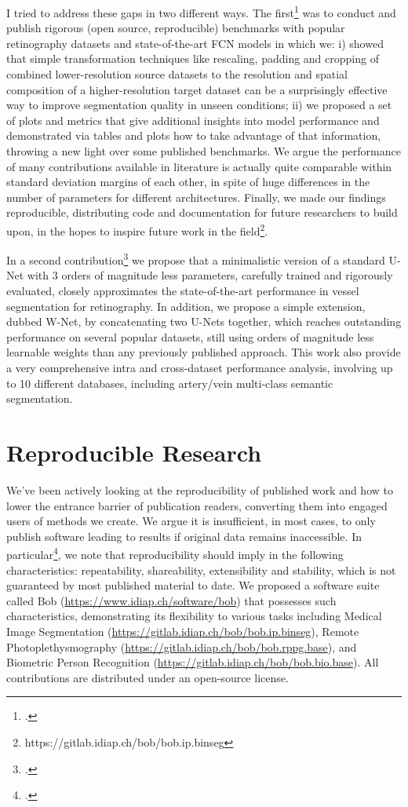 \documentclass[a4paper,10pt,onecolumn]{article}
\begin{document}
I tried to address these gaps in two different ways.  The
first\footcite{arxiv-2019} was to conduct and publish rigorous (open source,
reproducible) benchmarks with popular retinography datasets and
state-of-the-art FCN models in which we: i) showed that simple transformation
techniques like rescaling, padding and cropping of combined lower-resolution
source datasets to the resolution and spatial composition of a
higher-resolution target dataset can be a surprisingly effective way to improve
segmentation quality in unseen conditions; ii) we proposed a set of plots and
metrics that give additional insights into model performance and demonstrated
via tables and plots how to take advantage of that information, throwing a new
light over some published benchmarks.  We argue the performance of many
contributions available in literature is actually quite comparable within
standard deviation margins of each other, in spite of huge differences in the
number of parameters for different architectures.  Finally, we made our
findings reproducible, distributing code and documentation for future
researchers to build upon, in the hopes to inspire future work in the
field\footnote{https://gitlab.idiap.ch/bob/bob.ip.binseg}.

In a second contribution\footcite{arxiv-2020} we propose that a minimalistic
version of a standard U-Net with 3 orders of magnitude less parameters,
carefully trained and rigorously evaluated, closely approximates the
state-of-the-art performance in vessel segmentation for retinography.  In
addition, we propose a simple extension, dubbed W-Net, by concatenating two
U-Nets together, which reaches outstanding performance on several popular
datasets, still using orders of magnitude less learnable weights than any
previously published approach.  This work also provide a very comprehensive
intra and cross-dataset performance analysis, involving up to 10 different
databases, including artery/vein multi-class semantic segmentation.

\section{Reproducible Research}

We've been actively looking at the reproducibility of published work and how to
lower the entrance barrier of publication readers, converting them into engaged
users of methods we create.  We argue it is insufficient, in most cases, to
only publish software leading to results if original data remains inaccessible.
In particular\footcite{icml-2017-2}, we note that reproducibility should imply
in the following characteristics: repeatability, shareability, extensibility
and stability, which is not guaranteed by most published material to date.  We
proposed a software suite called Bob (\url{https://www.idiap.ch/software/bob})
that possesses such characteristics, demonstrating its flexibility to various
tasks including Medical Image Segmentation
(\url{https://gitlab.idiap.ch/bob/bob.ip.binseg}), Remote Photoplethysmography
(\url{https://gitlab.idiap.ch/bob/bob.rppg.base}), and Biometric Person
Recognition (\url{https://gitlab.idiap.ch/bob/bob.bio.base}).  All
contributions are distributed under an open-source license.
\end{document}
